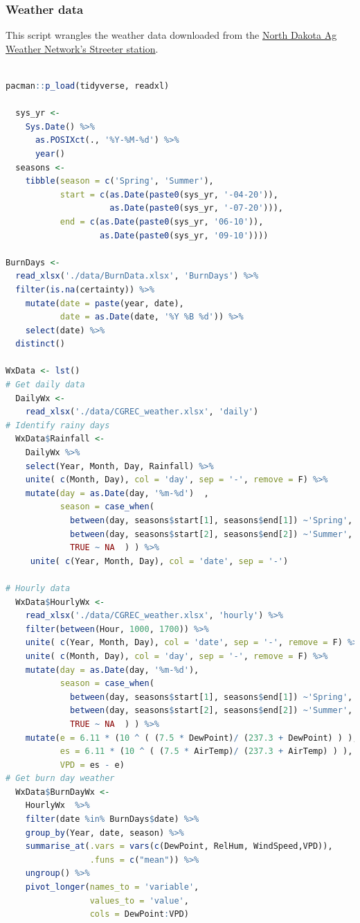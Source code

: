 \documentclass[
]{article}
\begin{document}
\subsubsection{Weather data}\label{weather-data}

This script wrangles the weather data downloaded from the
\href{https://ndawn.ndsu.nodak.edu/station-info.html?station=48}{North
Dakota Ag Weather Network's Streeter station}.

\begin{lstlisting}[language=R] 

pacman::p_load(tidyverse, readxl)

  sys_yr <- 
    Sys.Date() %>%
      as.POSIXct(., '%Y-%M-%d') %>%
      year() 
  seasons <- 
    tibble(season = c('Spring', 'Summer'), 
           start = c(as.Date(paste0(sys_yr, '-04-20')), 
                     as.Date(paste0(sys_yr, '-07-20'))), 
           end = c(as.Date(paste0(sys_yr, '06-10')), 
                   as.Date(paste0(sys_yr, '09-10'))))

BurnDays <- 
  read_xlsx('./data/BurnData.xlsx', 'BurnDays') %>%
  filter(is.na(certainty)) %>%
    mutate(date = paste(year, date), 
           date = as.Date(date, '%Y %B %d')) %>%
    select(date) %>%
  distinct() 

WxData <- lst() 
# Get daily data 
  DailyWx <- 
    read_xlsx('./data/CGREC_weather.xlsx', 'daily')
# Identify rainy days
  WxData$Rainfall <-
    DailyWx %>%
    select(Year, Month, Day, Rainfall) %>% 
    unite( c(Month, Day), col = 'day', sep = '-', remove = F) %>%
    mutate(day = as.Date(day, '%m-%d')  , 
           season = case_when(
             between(day, seasons$start[1], seasons$end[1]) ~'Spring', 
             between(day, seasons$start[2], seasons$end[2]) ~'Summer',
             TRUE ~ NA  ) ) %>% 
     unite( c(Year, Month, Day), col = 'date', sep = '-')

# Hourly data 
  WxData$HourlyWx <- 
    read_xlsx('./data/CGREC_weather.xlsx', 'hourly') %>%
    filter(between(Hour, 1000, 1700)) %>%
    unite( c(Year, Month, Day), col = 'date', sep = '-', remove = F) %>%
    unite( c(Month, Day), col = 'day', sep = '-', remove = F) %>%
    mutate(day = as.Date(day, '%m-%d'), 
           season = case_when(
             between(day, seasons$start[1], seasons$end[1]) ~'Spring', 
             between(day, seasons$start[2], seasons$end[2]) ~'Summer',
             TRUE ~ NA  ) ) %>%
    mutate(e = 6.11 * (10 ^ ( (7.5 * DewPoint)/ (237.3 + DewPoint) ) ), 
           es = 6.11 * (10 ^ ( (7.5 * AirTemp)/ (237.3 + AirTemp) ) ), 
           VPD = es - e) 
# Get burn day weather
  WxData$BurnDayWx <-
    HourlyWx  %>% 
    filter(date %in% BurnDays$date) %>%
    group_by(Year, date, season) %>%
    summarise_at(.vars = vars(c(DewPoint, RelHum, WindSpeed,VPD)),
                 .funs = c("mean")) %>%
    ungroup() %>%
    pivot_longer(names_to = 'variable', 
                 values_to = 'value', 
                 cols = DewPoint:VPD) 
\end{lstlisting}
\end{document}
